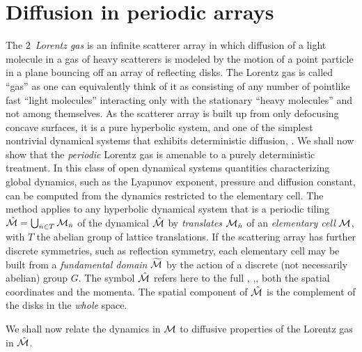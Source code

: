 \section{Diffusion in periodic arrays}
\label{s-DiffPerArr}

The $2$\dmn\ {\em Lorentz gas} is an infinite
scatterer array in which
diffusion of a light molecule in a gas of heavy scatterers
is modeled by the motion of
a point particle in a plane bouncing off an array of reflecting disks.
The Lorentz gas is called ``gas'' as one can equivalently think of
it as consisting of any number of pointlike fast ``light molecules''
interacting only with the stationary ``heavy molecules''
and not among themselves.
As the scatterer array is built up from only
defocusing concave surfaces, it is a pure hyperbolic system,
and one of the simplest nontrivial dynamical systems that
exhibits deterministic diffusion,
.
We shall now show that the {\em periodic} Lorentz gas
is amenable to a purely deterministic treatment.
In this class of open dynamical systems
quantities characterizing global dynamics, such as
the Lyapunov exponent, pressure and diffusion constant, can be
computed from the dynamics restricted to the elementary cell.
The method applies to any  hyperbolic dynamical system that is
a periodic tiling $\hat {{\cal M}}=\bigcup_{ \hat n \in T} {\cal M}_{\hat n}$
of the dynamical {\statesp} $\hat {{\cal M}}$ by {\em translates}
${\cal M}_{\hat n}$
of an {\em elementary cell} ${\cal M}$, with $T$ the abelian group of lattice
translations.
If the scattering array has further discrete symmetries, such
as reflection symmetry, each elementary cell may be built from a
{\em fundamental domain}
${\widetilde {{\cal M}}}$
by the action of a discrete (not necessarily abelian) group $G$.
The symbol $\hat {{\cal M}}$ refers here to the full {\statesp}, \ie,,
both the spatial coordinates and the momenta.
The spatial component of $\hat {{\cal M}}$ is the complement
of the disks in the {\em whole} space.

We shall now relate the dynamics in ${\cal M}$
to diffusive properties of the Lorentz gas in
$\hat {{\cal M}}$.

